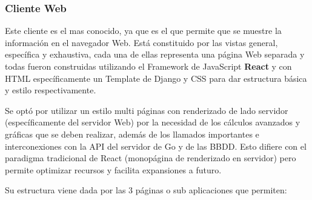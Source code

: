 \subsubsection{Cliente Web}

Este cliente es el mas conocido, ya que es el que permite que se muestre la
información en el navegador Web. Está constituido por las vistas general,
específica y exhaustiva, cada una de ellas representa una página Web separada y
todas fueron construidas utilizando el Framework de JavaScript \textbf{React}
y con HTML específicamente un Template de Django y CSS para dar estructura
básica y estilo respectivamente.

Se optó por utilizar un
estilo multi páginas con renderizado de lado servidor (específicamente del
servidor Web) por la necesidad de los cálculos avanzados y gráficas que
se deben realizar, además de los llamados importantes e interconexiones con la
API del servidor de Go y de las BBDD. Esto difiere con el paradigma tradicional de
React (monopágina de renderizado en servidor) pero permite optimizar recursos y
facilita expansiones a futuro.

Su estructura viene dada por las 3 páginas o sub aplicaciones que permiten:

